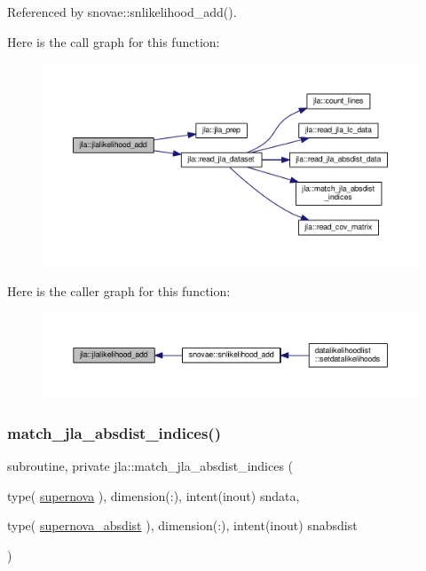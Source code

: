 Referenced by snovae\+::snlikelihood\+\_\+add().

Here is the call graph for this function\+:
\nopagebreak
\begin{figure}[H]
\begin{center}
\leavevmode
\includegraphics[width=350pt]{namespacejla_a76279ec95aebe74a01796fb5d2734d94_cgraph}
\end{center}
\end{figure}
Here is the caller graph for this function\+:
\nopagebreak
\begin{figure}[H]
\begin{center}
\leavevmode
\includegraphics[width=350pt]{namespacejla_a76279ec95aebe74a01796fb5d2734d94_icgraph}
\end{center}
\end{figure}
\mbox{\label{namespacejla_af2e3afa13e8cf5731d6cf06c1ddaf31a}} 
\subsubsection{\texorpdfstring{match\+\_\+jla\+\_\+absdist\+\_\+indices()}{match\_jla\_absdist\_indices()}}
{\footnotesize\ttfamily subroutine, private jla\+::match\+\_\+jla\+\_\+absdist\+\_\+indices (\begin{DoxyParamCaption}\item[{type( \mbox{\hyperlink{structjla_1_1supernova}{supernova}} ), dimension(\+:), intent(inout)}]{sndata,  }\item[{type( \mbox{\hyperlink{structjla_1_1supernova__absdist}{supernova\+\_\+absdist}} ), dimension(\+:), intent(inout)}]{snabsdist }\end{DoxyParamCaption})\hspace{0.3cm}{\ttfamily [private]}}




